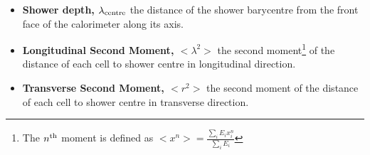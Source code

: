 \begin{itemize}
    \item {\bf Shower depth, $\lambda_{\rm centre}$} the distance of the shower
    barycentre from the front face of the calorimeter along its axis.  \item
    {\bf Longitudinal Second Moment,  $<\lambda^2>$} the second
    moment\footnote{The $n^{\rm th}$ moment is defined as $<x^n> =
    \frac{\sum_{i} E_i x^n_i}{\sum_{i} E_i}$} of the distance of each cell to
    shower centre in longitudinal direction.  \item {\bf Transverse Second
    Moment, $<r^2>$} the second moment of the distance of each cell to shower
    centre in transverse direction.
\end{itemize}


